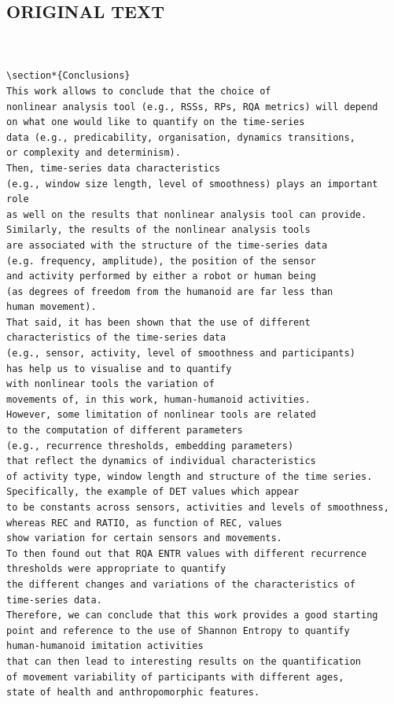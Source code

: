 \documentclass[10pt]{article}
\begin{document}
\subsection{ORIGINAL TEXT}
\begin{verbatim}


\section*{Conclusions}
This work allows to conclude that the choice of 
nonlinear analysis tool (e.g., RSSs, RPs, RQA metrics) will depend 
on what one would like to quantify on the time-series 
data (e.g., predicability, organisation, dynamics transitions, 
or complexity and determinism).
Then, time-series data characteristics 
(e.g., window size length, level of smoothness) plays an important role
as well on the results that nonlinear analysis tool can provide.
Similarly, the results of the nonlinear analysis tools
are associated with the structure of the time-series data 
(e.g. frequency, amplitude), the position of the sensor 
and activity performed by either a robot or human being
(as degrees of freedom from the humanoid are far less than
human movement). 
That said, it has been shown that the use of different 
characteristics of the time-series data 
(e.g., sensor, activity, level of smoothness and participants)
has help us to visualise and to quantify 
with nonlinear tools the variation of 
movements of, in this work, human-humanoid activities.
However, some limitation of nonlinear tools are related 
to the computation of different parameters 
(e.g., recurrence thresholds, embedding parameters)
that reflect the dynamics of individual characteristics 
of activity type, window length and structure of the time series.
Specifically, the example of DET values which appear 
to be constants across sensors, activities and levels of smoothness, 
whereas REC and RATIO, as function of REC, values 
show variation for certain sensors and movements. 
To then found out that RQA ENTR values with different recurrence 
thresholds were appropriate to quantify 
the different changes and variations of the characteristics of 
time-series data.
Therefore, we can conclude that this work provides a good starting 
point and reference to the use of Shannon Entropy to quantify 
human-humanoid imitation activities 
that can then lead to interesting results on the quantification 
of movement variability of participants with different ages, 
state of health and anthropomorphic features.


\end{verbatim}
\end{document}
